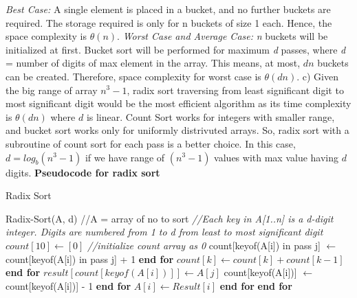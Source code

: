 \documentclass[a4paper,12pt]{article}
\begin{document}
{{\textit{Best Case:} \newline
A single element is placed in a bucket, and no further buckets are required. The storage required is only for n buckets of size 1 each. Hence, the space complexity is $\theta(n)$. \newline \newline
\textit{Worst Case and Average Case:} \newline
\textit{n} buckets will be initialized at first. Bucket sort will be performed for maximum \textit{d} passes, where \textit {d} = number of digits of max element in the array. This means, at most, $dn$ buckets can be created. Therefore, space complexity for worst case is $\theta(dn)$. 
\newpage
c) Given the big range of array \textit{$n^3-1$}, radix sort traversing from least significant digit to most significant digit would be the most efficient algorithm as its time complexity is $\theta(dn)$ where $d$ is linear. Count Sort works for integers with smaller range, and bucket sort works only for uniformly distrivuted arrays. So, radix sort with a subroutine of count sort for each pass is a better choice. In this case, $ d = log _b(n^3-1) $ if we have range of $(n^3-1)$ values with max value having $d$ digits. \newline \newline
\textbf{Pseudocode for radix sort} \newline
\begin{algorithm} 
\caption{Radix Sort} \label{euclid}
\begin {algorithmic} [1]
\State Radix-Sort(A, d) //A = array of no to sort \newline
{\footnotesize \textit {//Each key in A[1..n] is a d-digit integer. Digits are numbered from 1 to d from least to most significant digit}}
\State $ count[10] \gets [0] $ {\footnotesize \textit{//initialize count array as 0}}
\State count[keyof(A[i]) in pass j] $ \gets $ count[keyof(A[i]) in pass j] + 1  
\EndFor
\State \textbf{end for}
\State $ count[k] \gets count[k] + count[k-1] $
\EndFor
\State \textbf{end for}
\State $ result[count[keyof(A[i])]] \gets A[j] $
\State  count[keyof(A[i])] $ \gets $ count[keyof(A[i])] - 1
\EndFor
\State \textbf{end for}
 \newline
{}
\State $ A[i] \gets Result[i] $
\EndFor
\State \textbf{end for}
\EndFor
\State \textbf{end for}
\end{algorithmic}
\end{algorithm} }}
\end{document}
